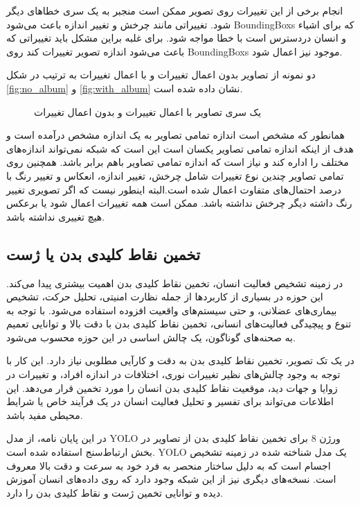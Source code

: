 انجام برخی از این تغییرات روی تصویر ممکن است منجبر به یک سری خطاهای دیگر شود. تغییراتی مانند چرخش و تغییر اندازه باعث می‌شود %
\glspl{BoundingBox}
که برای اشیاء و انسان دردسترس است با خطا مواجه شود. برای غلبه براین مشکل باید تغییراتی که باعث می‌شود اندازه تصویر تغییرات کند روی %
\glspl{BoundingBox}
 موجود نیز اعمال شود. 

دو نمونه از تصاویر بدون اعمال تغییرات و با اعمال تغییرات به ترتیب در شکل %
 \ref{fig:no_album}
 و
\ref{fig:with_album}
نشان داده شده است. 
\begin{figure}
	\centering
	\hfill
	\hfill
	\caption{یک سری تصاویر با اعمال تغییرات و بدون اعمال تغییرات}
	\label{fig:with_no_album}
\end{figure}
همانطور که مشخص است اندازه تمامی تصاویر به یک اندازه مشخص درآمده است و هدف از اینکه اندازه تمامی تصاویر یکسان است این است که شبکه نمی‌تواند اندازه‌های مختلف را اداره کند و نیاز است که اندازه تمامی تصاویر باهم برابر باشد. همچنین روی تمامی تصاویر چندین نوع تغییرات شامل چرخش، تغییر اندازه، انعکاس و تغییر رنگ با درصد احتمال‌های متفاوت اعمال شده است.البته اینطور نیست که اگر تصویری تغییر رنگ داشته دیگر چرخش نداشته باشد. ممکن است همه تغییرات اعمال شود یا برعکس هیچ تغییری نداشته باشد.

\subsection{تخمین نقاط کلیدی بدن یا ژست}
در زمینه تشخیص فعالیت انسان، تخمین نقاط کلیدی بدن اهمیت بیشتری پیدا می‌کند. این حوزه در بسیاری از کاربردها از جمله نظارت امنیتی، تحلیل حرکت، تشخیص بیماری‌های عضلانی، و حتی سیستم‌های واقعیت افزوده استفاده می‌شود. با توجه به تنوع و پیچیدگی فعالیت‌های انسانی، تخمین نقاط کلیدی بدن با دقت بالا و توانایی تعمیم به صحنه‌های گوناگون، یک چالش اساسی در این حوزه محسوب می‌شود.

در یک تک تصویر، تخمین نقاط کلیدی بدن به دقت و کارآیی مطلوبی نیاز دارد. این کار با توجه به وجود چالش‌های نظیر تغییرات نوری، اختلافات در اندازه افراد، و تغییرات در زوایا و جهات دید، موقعیت نقاط کلیدی بدن انسان را مورد تخمین قرار می‌دهد. این اطلاعات می‌تواند برای تفسیر و تحلیل فعالیت انسان در یک فرآیند خاص یا شرایط محیطی مفید باشد.

در این پایان نامه، از مدل YOLO%
 ورژن 8 برای تخمین نقاط کلیدی بدن از تصاویر در بخش ارتباط‌سنج استفاده شده است. YOLO یک مدل شناخته ‌شده در زمینه تشخیص اجسام است که به دلیل ساختار منحصر به فرد خود به سرعت و دقت بالا معروف است. نسخه‌های دیگری نیز از این شبکه وجود دارد که روی داده‌های انسان آموزش دیده و توانایی تخمین ژست و نقاط کلیدی بدن را دارد.

